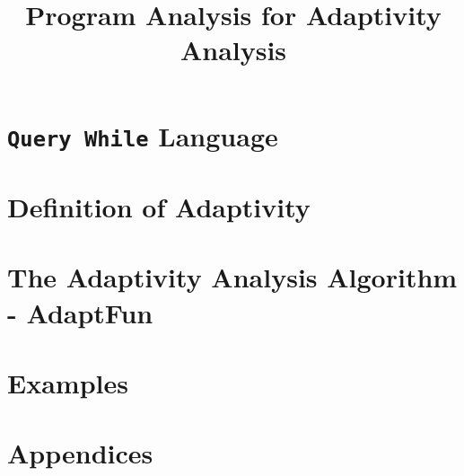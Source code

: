 \documentclass[a4paper,11pt]{article}
\newcommand{\THESYSTEM}{\textsf{AdaptFun}}
\begin{document}
\title{Program Analysis for Adaptivity Analysis}

\author{}

\date{}

\maketitle
%
\tableofcontents


% 
% 

\section{{\tt Query While} Language}
\label{sec:language}

\clearpage
\section{Definition of Adaptivity}
\label{sec:adaptivity}

\clearpage
\section{The Adaptivity Analysis Algorithm - {\THESYSTEM}}
\label{sec:algorithm}


\section{Examples}
\label{sec:examples}


% 


% 
% 

%
\clearpage
\appendix
{}
\section*{Appendices}



\end{document}
